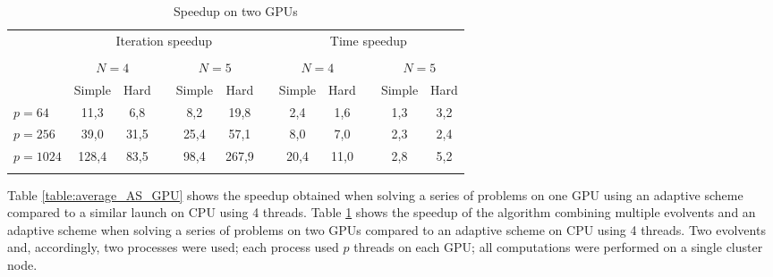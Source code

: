 \documentclass{svproc}
\begin{document}
\begin{table}
                \caption{Speedup on two GPUs}
                \label{table:average_MMAS_GPU}
                \center
                \begin{tabular}{lccccccccccc}
                & \multicolumn{5}{c}{ Iteration speedup} & & \multicolumn{5}{c}{ Time speedup}\\
                               \noalign{\smallskip} \cline{2-6} \cline{8-12}  \\
                               & \multicolumn{2}{c}{ $N=4$ } & & \multicolumn{2}{c}{$N=5$} &  & \multicolumn{2}{c}{ $N=4$ } & & \multicolumn{2}{c}{$N=5$} \\
                               \noalign{\smallskip} \cline{2-3} \cline{5-6}  \cline{8-9} \cline{11-12} \noalign{\smallskip}
                               & Simple & Hard & & Simple & Hard &  & Simple & Hard & & Simple & Hard  \\
                               \noalign{\smallskip} \hline \noalign{\smallskip}                               
                               $p=64$  &    11,3	 & 6,8	 &   & 8,2	 & 19,8  &   & 2,4	 & 1,6	 &   & 1,3	 & 3,2 \\
                               $p=256$ &    39,0	 & 31,5 &   & 25,4	 & 57,1  &   & 8,0	 & 7,0	 &   & 2,3	 & 2,4 \\
							   $p=1024$&    128,4	 & 83,5 &   & 98,4	 & 267,9 &   & 20,4  & 11,0  &   & 2,8	 & 5,2 \\
                               \noalign{\smallskip}\hline
                \end{tabular}
\end{table}


Table \ref{table:average_AS_GPU} shows the speedup obtained when solving a series of problems on one GPU using an adaptive scheme compared to a similar launch on CPU using 4 threads. Table \ref{table:average_MMAS_GPU} shows the speedup of the algorithm combining multiple evolvents and an adaptive scheme when solving a series of problems on two GPUs compared to an adaptive scheme on CPU using 4 threads. Two evolvents and, accordingly, two processes were used; each process used $p$ threads on each GPU; all computations were performed on a single cluster node.
\end{document}

